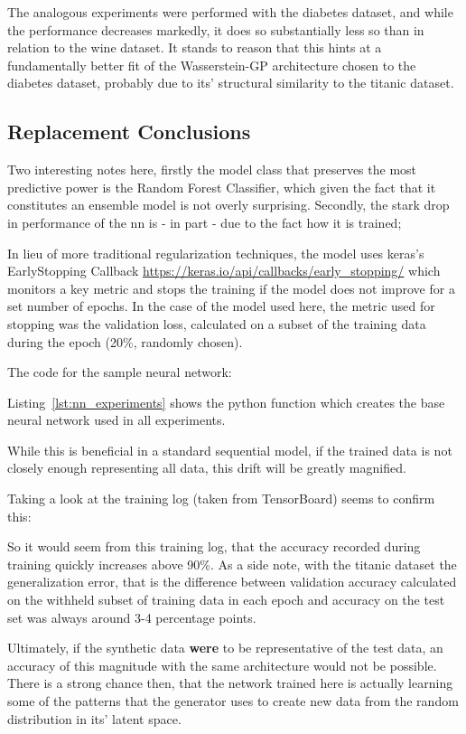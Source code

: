 The analogous experiments were performed with the diabetes dataset, and while the performance decreases markedly, it does so substantially less so than in relation to the wine dataset. It stands to reason that this hints at a fundamentally better fit of the Wasserstein-GP architecture chosen to the diabetes dataset, probably due to its' structural similarity to the titanic dataset.

\pagebreak

\subsection{Replacement Conclusions}

Two interesting notes here, firstly the model class that preserves the most predictive power is the Random Forest Classifier, which given the fact that it constitutes an ensemble model is not overly surprising. Secondly, the stark drop in performance of the \ac{nn} is - in part - due to the fact how it is trained;

In lieu of more traditional regularization techniques, the model uses keras's EarlyStopping Callback \url{https://keras.io/api/callbacks/early_stopping/} which monitors a key metric and stops the training if the model does not improve for a set number of epochs. 
In the case of the model used here, the metric used for stopping was the validation loss, calculated on a subset of the training data during the epoch (20\%, randomly chosen).

The code for the sample neural network:



Listing~\ref{lst:nn_experiments} shows the python function which creates the base neural network used in all experiments.

While this is beneficial in a standard sequential model, if the trained data is not closely enough representing all data,
this drift will be greatly magnified. 

\pagebreak

Taking a look at the training log (taken from TensorBoard) seems to confirm this:


So it would seem from this training log, that the accuracy recorded during training quickly increases above 90\%. As a side note, with the titanic dataset the generalization error, that is the difference between validation accuracy calculated on the withheld subset of training data in each epoch and accuracy on the test set was always around 3-4 percentage points.

Ultimately, if the synthetic data \textbf{were} to be representative of the test data, an accuracy of this magnitude with the same architecture would not be possible. There is a strong chance then, that the network trained here is actually learning some of the patterns that the generator uses to create new data from the random distribution in its' latent space.
